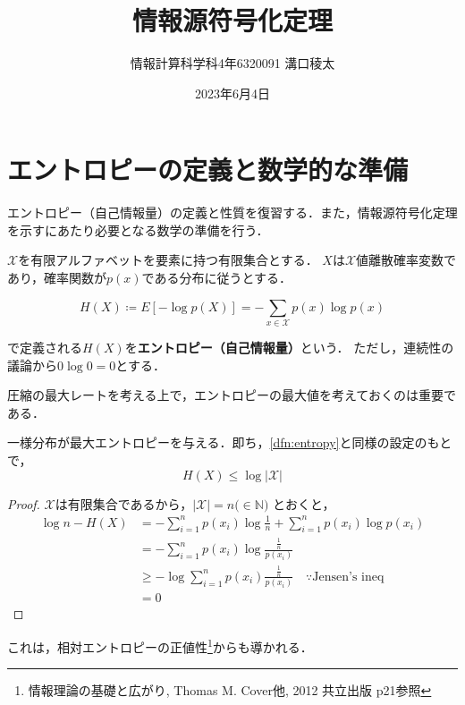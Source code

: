 \documentclass{classes/myclass}
\title{情報源符号化定理}
\author{情報計算科学科4年6320091 溝口稜太}
\date{2023年6月4日}
\begin{document}
\maketitle

\section{エントロピーの定義と数学的な準備}

エントロピー（自己情報量）の定義と性質を復習する．また，情報源符号化定理を示すにあたり必要となる数学の準備を行う．

\begin{dfn}\label{dfn:entropy}
$\mathcal{X}$を有限アルファベットを要素に持つ有限集合とする．
$X$は$\mathcal{X}$値離散確率変数であり，確率関数が$p(x)$である分布に従うとする．

\[
  H(X) \coloneq E[-\log p(X)] = -\sum_{x \in \mathcal{X}}p(x) \log p(x)
\]

で定義される$H(X)$を\textbf{エントロピー（自己情報量）}という．
ただし，連続性の議論から$0 \log 0 = 0$とする．
\end{dfn}


圧縮の最大レートを考える上で，エントロピーの最大値を考えておくのは重要である．

\begin{thm}[エントロピーの最大値]
一様分布が最大エントロピーを与える．即ち，\ref{dfn:entropy}と同様の設定のもとで，
\[
  H(X) \leq \log |\mathcal{X}|
\]
\end{thm}

\begin{proof}
  $\mathcal{X}$は有限集合であるから，$|\mathcal{X}| = n \lparen \in \mathbb{N} \rparen$ とおくと，
\begin{align*}
  \log n - H(X) &= -\sum_{i = 1}^{n} p(x_i) \log \frac{1}{n} + \sum_{i = 1}^{n} p(x_i) \log p(x_i) \\
  &= -\sum_{i = 1}^n p(x_i) \log \frac{\frac{1}{n}}{p(x_i)} \\
  &\geq - \log \sum_{i = 1}^n p(x_i) \frac{\frac{1}{n}}{p(x_i)} \quad \because \text{Jensen's ineq}\\
  &= 0
\end{align*}
\end{proof}

これは，相対エントロピーの正値性\footnote{情報理論の基礎と広がり, Thomas M. Cover他, 2012 共立出版 p21参照  }からも導かれる．
\end{document}
